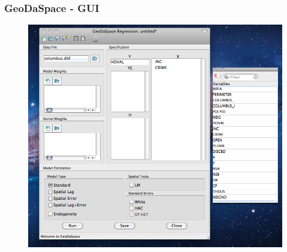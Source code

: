 \documentclass[nototal]{beamer}
\begin{document}
\begin{frame}
	\frametitle{GeoDaSpace - GUI}
  \begin{figure}
  \includegraphics[scale=0.25]{figs/gs2.png}
  \end{figure}
 \end{frame} 
\end{document}
